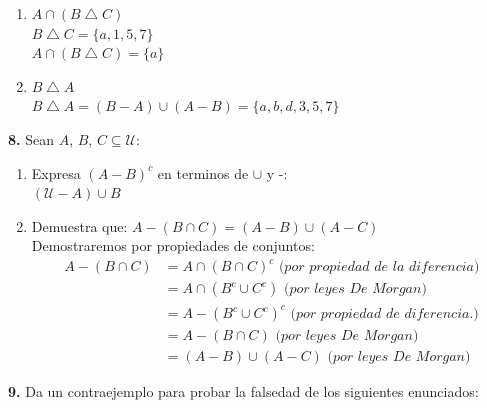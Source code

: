 \documentclass[12pt]{article}
\begin{document}
\begin{enumerate}[label=\alph*)]
\begin{enumerate}
        \item $A \cap (B \bigtriangleup C)$\\
        $B \bigtriangleup C = \{a, 1, 5, 7\}$\\
        $A \cap (B \bigtriangleup C) = \{a\}$\\

        \item $ B \bigtriangleup A$\\
        $B \bigtriangleup A = (B - A) \cup (A - B) = \{a, b, d, 3, 5, 7\}$
    \end{enumerate}
\end{enumerate}

%
%
\textbf{8.} Sean $A$, $B$, $C \subseteq \mathcal{U}$:
\begin{enumerate}[label=\alph*)]
    \item Expresa $(A - B)^c$ en terminos de $\cup$ y -:\\
    $(\mathcal{U} - A) \cup B$

    \item Demuestra que: $A - (B \cap C) = (A - B) \cup (A - C)$\\
    Demostraremos por propiedades de conjuntos:
    \begin{align*}
        A - (B \cap C) &= A \cap (B \cap C)^c \textit{ (por propiedad de la diferencia)}\\
        &= A \cap (B^c \cup C^c) \textit{ (por leyes De Morgan)}\\
        &= A - (B^c \cup C^c)^c \textit{ (por propiedad de diferencia.)}\\
        &= A - (B \cap C) \textit{ (por leyes De Morgan)}\\
        &= (A - B) \cup (A - C) \textit{ (por leyes De Morgan)}
    \end{align*}
\end{enumerate}

% 
%
\textbf{9.} Da un contraejemplo para probar la falsedad de los siguientes enunciados:
\end{document}
